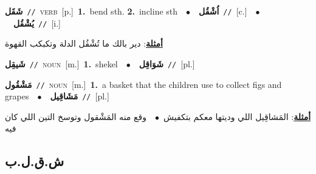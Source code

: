 \documentclass[10pt,a4paper,twoside]{article} %
\begin{document}
\begin{multicols}{2}
{\setlength\topsep{0pt}\textbf{\foreignlanguage{arabic}{شَقَل}}\ {\color{gray}\texttt{//}\color{black}}\ \textsc{verb}\ [p.]\ \textbf{1.}~bend sth.  \textbf{2.}~incline sth\ \ $\bullet$\ \ \setlength\topsep{0pt}\textbf{\foreignlanguage{arabic}{اُشْقُل}}\ {\color{gray}\texttt{//}\color{black}}\ [c.]\ \ $\bullet$\ \ \setlength\topsep{0pt}\textbf{\foreignlanguage{arabic}{يُشْقُل}}\ {\color{gray}\texttt{//}\color{black}}\ [i.]\  \begin{flushright}\color{gray}\foreignlanguage{arabic}{\textbf{\underline{\foreignlanguage{arabic}{أمثلة}}}: دير بالك ما تُشْقُل الدلة وتكبكب القهوة}\end{flushright}\color{black}} \vspace{2mm}

{\setlength\topsep{0pt}\textbf{\foreignlanguage{arabic}{شَيقِل}}\ {\color{gray}\texttt{//}\color{black}}\ \textsc{noun}\ [m.]\ \textbf{1.}~shekel\ \ $\bullet$\ \ \setlength\topsep{0pt}\textbf{\foreignlanguage{arabic}{شَوَاقِل}}\ {\color{gray}\texttt{//}\color{black}}\ [pl.]\ } \vspace{2mm}

{\setlength\topsep{0pt}\textbf{\foreignlanguage{arabic}{مَشْقُول}}\ {\color{gray}\texttt{//}\color{black}}\ \textsc{noun}\ [m.]\ \textbf{1.}~a basket that the children use to collect figs and grapes\ \ $\bullet$\ \ \setlength\topsep{0pt}\textbf{\foreignlanguage{arabic}{مَشَاقِيل}}\ {\color{gray}\texttt{//}\color{black}}\ [pl.]\  \begin{flushright}\color{gray}\foreignlanguage{arabic}{\textbf{\underline{\foreignlanguage{arabic}{أمثلة}}}: المَشاقِيل اللي وديتها معكم بتكفيش\ $\bullet$\ \  وقع منه المَشْقول وتوسخ التين اللي كان فيه}\end{flushright}\color{black}} \vspace{2mm}

\vspace{-3mm}
\subsection*{\color{blue}\foreignlanguage{arabic}{ش.ق.ل.ب}\color{blue}{}} 


\end{multicols}
\end{document}
